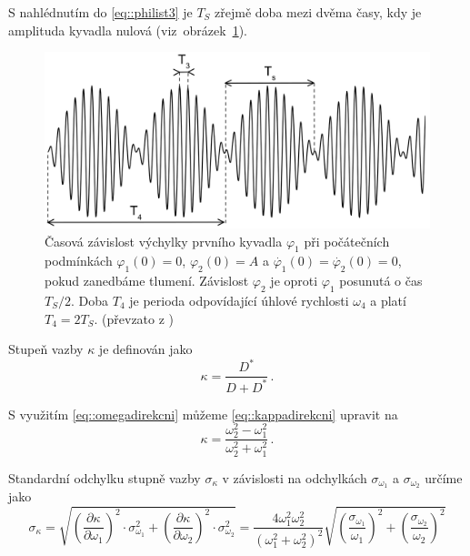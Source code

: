 S nahlédnutím do \eqref{eq::philist3} je $T_S$ zřejmě doba mezi dvěma časy, kdy je amplituda kyvadla nulová (viz~obrázek~\ref{obr::tretipripad}).

\begin{figure}[htbp]
\centering
\includegraphics[width=\textwidth-2cm]{graficos/ts}
\caption{Časová závislost výchylky prvního kyvadla $\varphi_1$ při počátečních podmínkách $\varphi_1(0)=0$, $\varphi_2(0)=A$ a $\dot{\varphi_1}(0)=\dot{\varphi_2}(0)=0$, pokud zanedbáme tlumení. Závislost $\varphi_2$ je oproti $\varphi_1$ posunutá o čas $T_S/2$. Doba $T_4$ je perioda odpovídající úhlové rychlosti $\omega_4$ a platí $T_4=2T_S$. (převzato z \cite{ZFP})}
\label{obr::tretipripad}
\end{figure}

Stupeň vazby $\kappa$ je definován jako \cite{ZFP}
\begin{equation} \label{eq::kappadirekcni}
\kappa = \frac{D^{\ast}}{D+D^{\ast}} \,.
\end{equation} 

S využitím \eqref{eq::omegadirekcni} můžeme \eqref{eq::kappadirekcni} upravit na
\begin{equation}
\kappa = \frac{\omega_2^2-\omega_1^2}{\omega_2^2+\omega_1^2} \,.
\end{equation}

Standardní odchylku stupně vazby $\sigma_\kappa$ v závislosti na odchylkách $\sigma _{\omega_1}$ a $\sigma _{\omega_2}$ určíme jako
\begin{equation} \label{eq::odchylkakappa}
\sigma _\kappa = \sqrt{ \left( \frac{\partial \kappa}{\partial \omega_1} \right) ^2 \cdot \sigma_{\omega_1}^2    +   \left(  \frac{\partial \kappa}{\partial \omega_2}     \right)^2 \cdot \sigma_{\omega_2}^2    } = \frac{4 \omega_1^2 \omega_2^2}{ \left( \omega_1^2+\omega_2^2 \right) ^2} \sqrt{ \left( \frac{\sigma _{\omega_1}}{\omega_1}      \right)^2    +      \left( \frac{\sigma _{\omega_2}}{\omega_2}      \right)^2                   }
\end{equation}

